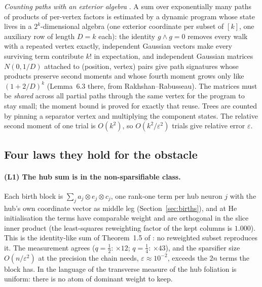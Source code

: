 \emph{Counting paths with an exterior algebra} \cite{ext}. A sum over exponentially many paths of products of
per-vertex factors is estimated by a dynamic program whose state lives in a $2^k$-dimensional algebra (one
exterior coordinate per subset of $[k]$, one auxiliary row of length $D=k$ each): the identity $g\wedge g=0$
removes every walk with a repeated vertex exactly, independent Gaussian vectors make every surviving term
contribute $k!$ in expectation, and independent Gaussian matrices $N(0,1/D)$ attached to (position, vertex)
pairs give path signatures whose products preserve second moments and whose fourth moment grows only like
$(1+2/D)^{k}$ (Lemma~6.3 there, from Rakhshan--Rabusseau). The matrices must be \emph{shared} across all partial
paths through the same vertex for the program to stay small; the moment bound is proved for exactly that reuse.
Trees are counted by pinning a separator vertex and multiplying the component states. The relative second moment
of one trial is $O(k^2)$, so $O(k^2/\varepsilon^2)$ trials give relative error $\varepsilon$.

\subsection{Four laws they hold for the obstacle}
\paragraph{(L1) The hub sum is in the non-sparsifiable class.} Each birth block is $\sum_j a_j\otimes e_j\otimes c_j$,
one rank-one term per hub neuron $j$ with the hub's own coordinate vector as middle leg (Section~\ref{sec:births}),
and at He initialisation the terms have comparable weight and are orthogonal in the slice inner product (the
least-squares reweighting factor of the kept columns is $1.000$). This is the identity-like sum of
Theorem~1.5 of \cite{BBP}: no reweighted subset reproduces it. The measurement agrees ($q=\tfrac12$: $\times12$;
$q=\tfrac14$: $\times43$), and the sparsifier size $O(n/\varepsilon^2)$ at the precision the chain needs,
$\varepsilon\approx10^{-2}$, exceeds the $2n$ terms the block has. In the language of \cite{stage8} the
transverse measure of the hub foliation is uniform: there is no atom of dominant weight to keep.

